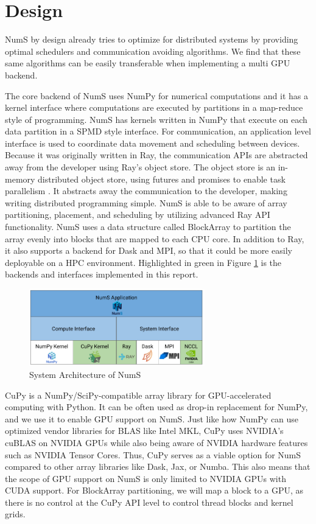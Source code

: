 \documentclass{article}
\begin{document}
\section{Design}
NumS by design already tries to optimize for distributed systems by providing optimal schedulers and communication avoiding algorithms. \cite{nums} We find that these same algorithms can be easily transferable when implementing a multi GPU backend.

The core backend of NumS uses NumPy for numerical computations and it has a kernel interface where computations are executed by partitions in a map-reduce style of programming. NumS has kernels written in NumPy that execute on each data partition in a SPMD style interface. For communication, an application level interface is used to coordinate data movement and scheduling between devices. Because it was originally written in Ray, the communication APIs are abstracted away from the developer using Ray's object store. The object store is an in-memory distributed object store, using futures and promises to enable task parallelism \cite{ray}. It abstracts away the communication to the developer, making writing distributed programming simple. NumS is able to be aware of array partitioning, placement, and scheduling by utilizing advanced Ray API functionality. NumS uses a data structure called BlockArray to partition the array evenly into blocks that are mapped to each CPU core. In addition to Ray, it also supports a backend for Dask and MPI, so that it could be more easily deployable on a HPC environment. Highlighted in green in Figure \ref{fig:system_arch} is the backends and interfaces implemented in this report.

\begin{figure}
	\centerline{\includegraphics[width=3in]{figures/system_architecture.png}}
	\caption{System Architecture of NumS}
	\label{fig:system_arch}
\end{figure}

CuPy is a NumPy/SciPy-compatible array library for GPU-accelerated computing with Python. It can be often used as drop-in replacement for NumPy, and we use it to enable GPU support on NumS. \cite{cupy} Just like how NumPy can use optimized vendor libraries for BLAS like Intel MKL, CuPy uses NVIDIA's cuBLAS on NVIDIA GPUs while also being aware of NVIDIA hardware features such as NVIDIA Tensor Cores. Thus, CuPy serves as a viable option for NumS compared to other array libraries like Dask, Jax, or Numba. This also means that the scope of GPU support on NumS is only limited to NVIDIA GPUs with CUDA support. For BlockArray partitioning, we will map a block to a GPU, as there is no control at the CuPy API level to control thread blocks and kernel grids.
\end{document}
